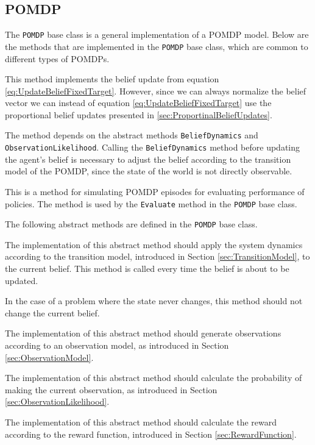 \subsection{POMDP}
\label{sec:POMDP}
The \texttt{POMDP} base class is a general implementation of a POMDP model. Below are the methods that are implemented in the \texttt{POMDP} base class, which are common to different types of POMDPs.
\begin{description} [style=nextline]
  \item[\texttt{UpdateBelief}]
  This method implements the belief update from equation \eqref{eq:UpdateBeliefFixedTarget}. However, since we can always normalize the belief vector we can instead of equation \eqref{eq:UpdateBeliefFixedTarget} use the proportional belief updates presented in \ref{sec:ProportinalBeliefUpdates}.

  The method depends on the abstract methods \texttt{BeliefDynamics} and \texttt{ObservationLikelihood}. Calling the \texttt{BeliefDynamics} method before updating the agent's belief is necessary to adjust the belief according to the transition model of the POMDP, since the state of the world is not directly observable.

  \item[\texttt{Simulate}]
  This is a method for simulating POMDP episodes for evaluating performance of policies. The method is used by the \texttt{Evaluate} method in the \texttt{POMDP} base class.
\end{description}
The following abstract methods are defined in the \texttt{POMDP} base class.
\begin{description} [style=nextline]
  \item[\texttt{BeliefDynamics}]
  The implementation of this abstract method should apply the system dynamics according to the transition model, introduced in Section \ref{sec:TransitionModel}, to the current belief. This method is called every time the belief is about to be updated.

  In the case of a problem where the state never changes, this method should not change the current belief.

  \item[\texttt{GenerateObservation}]
  The implementation of this abstract method should generate observations according to an observation model, as introduced in Section \ref{sec:ObservationModel}.

  \item[\texttt{ObservationLikelihood}]
  The implementation of this abstract method should calculate the probability of making the current observation, as introduced in Section \ref{sec:ObservationLikelihood}.

  \item[\texttt{Reward}]
  The implementation of this abstract method should calculate the reward according to the reward function, introduced in Section \ref{sec:RewardFunction}.

\end{description}

